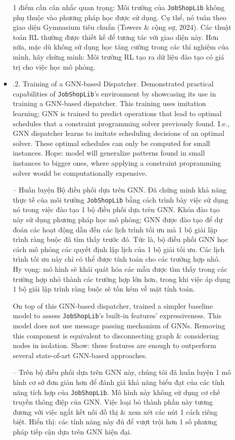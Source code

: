 \documentclass{article}
\begin{document}
\begin{itemize}
\begin{itemize}
\begin{itemize}
\begin{itemize}
            \end{itemize}
            1 điểm cần cân nhắc quan trọng: Môi trường của {\tt JobShopLib} không phụ thuộc vào phương pháp học được sử dụng. Cụ thể, nó tuân theo giao diện Gymnasium tiêu chuẩn (Towers \& cộng sự, 2024). Các thuật toán RL thường được thiết kế để tương tác với giao diện này. Hơn nữa, mặc dù không sử dụng học tăng cường trong các thí nghiệm của mình, hãy chứng minh: Môi trường RL tạo ra dữ liệu đào tạo có giá trị cho việc học mô phỏng.
            \item {.2. Training of a GNN-based Dispatcher.} Demonstrated practical capabilities of {\tt JobShopLib}'s environment by showcasing its use in training a GNN-based dispatcher. This training uses imitation learning; GNN is trained to predict operations that lead to optimal schedules that a constraint programming solver previously found. I.e., GNN dispatcher learns to imitate scheduling decisions of an optimal solver. These optimal schedules can only be computed for small instances. Hope: model will generalize patterns found in small instances to bigger ones, where applying a constraint propramming solver would be computationally expensive.

            -- {\sf  Huấn luyện Bộ điều phối dựa trên GNN.} Đã chứng minh khả năng thực tế của môi trường {\tt JobShopLib} bằng cách trình bày việc sử dụng nó trong việc đào tạo 1 bộ điều phối dựa trên GNN. Khóa đào tạo này sử dụng phương pháp học mô phỏng; GNN được đào tạo để dự đoán các hoạt động dẫn đến các lịch trình tối ưu mà 1 bộ giải lập trình ràng buộc đã tìm thấy trước đó. Tức là, bộ điều phối GNN học cách mô phỏng các quyết định lập lịch của 1 bộ giải tối ưu. Các lịch trình tối ưu này chỉ có thể được tính toán cho các trường hợp nhỏ. Hy vọng: mô hình sẽ khái quát hóa các mẫu được tìm thấy trong các trường hợp nhỏ thành các trường hợp lớn hơn, trong khi việc áp dụng 1 bộ giải lập trình ràng buộc sẽ tốn kém về mặt tính toán.

            On top of this GNN-based dispatcher, trained a simpler baseline model to assess {\tt JobShopLib}'s built-in features' expressiveness. This model does not use message passing mechanism of GNNs. Removing this component is equivalent to disconnecting graph \& considering nodes in isolation. Show: these features are enough to outperform several state-of-art GNN-based approaches.

            -- Trên bộ điều phối dựa trên GNN này, chúng tôi đã huấn luyện 1 mô hình cơ sở đơn giản hơn để đánh giá khả năng biểu đạt của các tính năng tích hợp của {\tt JobShopLib}. Mô hình này không sử dụng cơ chế truyền thông điệp của GNN. Việc loại bỏ thành phần này tương đương với việc ngắt kết nối đồ thị \& xem xét các nút 1 cách riêng biệt. Hiển thị: các tính năng này đủ để vượt trội hơn 1 số phương pháp tiếp cận dựa trên GNN hiện đại.


\end{itemize}
\end{itemize}
\end{itemize}
\end{document}
